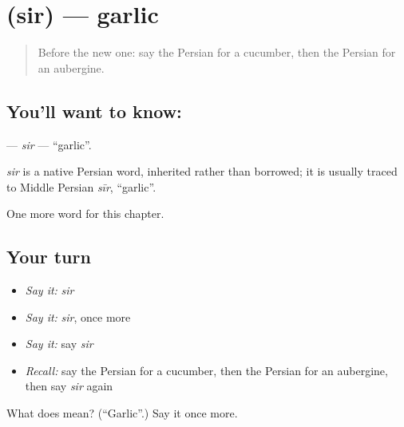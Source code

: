\section[\texorpdfstring{\fa{سیر} (sir)}{سیر (sir)}]{ (sir) — garlic}

\label{lesson:FA-C101-sir}



\begin{quote}
Before the new one: say the Persian for a cucumber, then the Persian for an aubergine.
\end{quote}

\subsection*{You'll want to know: }
\textbf{} — \emph{sir} — \textquotedblleft{}garlic\textquotedblright{}.

\begin{cousinweb}
\emph{sir} is a native Persian word, inherited rather than borrowed; it is usually traced to Middle Persian \emph{sīr}, \textquotedblleft{}garlic\textquotedblright{}.
\end{cousinweb}

\begin{grammarlens}[title={What you've built}]
One more word for this chapter.
\end{grammarlens}

\subsection*{Your turn}
\begin{itemize}
\raggedright
  \item \emph{Say it:} \emph{sir}
  \item \emph{Say it:} \emph{sir}, once more
  \item \emph{Say it:} say \emph{sir}
  \item \emph{Recall:} say the Persian for a cucumber, then the Persian for an aubergine, then say \emph{sir} again
\end{itemize}

\begin{tcolorbox}[breakable,colback=teal!4,colframe=teal!35!black,title={Before you move on}]
What does  mean? (\textquotedblleft{}Garlic\textquotedblright{}.) Say it once more.
\end{tcolorbox}
